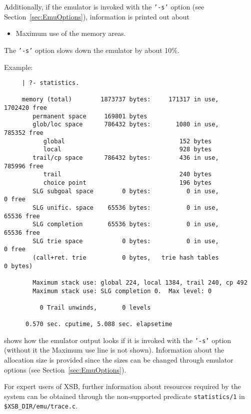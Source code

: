 \begin{description}
    Additionally, if the emulator is invoked with the {\tt '-s'} option
    (see Section~\ref{sec:EmuOptions}), information is printed out about
    \begin{itemize}
    \item Maximum use of the memory areas.
    \end{itemize}
    The {\tt '-s'} option slows down the emulator by about 10\%.

    Example:
    {\footnotesize
     \begin{verbatim}
     | ?- statistics.

     memory (total)        1873737 bytes:     171317 in use,    1702420 free
        permanent space     169801 bytes
        glob/loc space      786432 bytes:       1080 in use,     785352 free
           global                                152 bytes
           local                                 928 bytes
        trail/cp space      786432 bytes:        436 in use,     785996 free
           trail                                 240 bytes
           choice point                          196 bytes
        SLG subgoal space        0 bytes:          0 in use,          0 free
        SLG unific. space    65536 bytes:          0 in use,      65536 free
        SLG completion       65536 bytes:          0 in use,      65536 free
        SLG trie space           0 bytes:          0 in use,          0 free
        (call+ret. trie          0 bytes,   trie hash tables          0 bytes)

        Maximum stack use: global 224, local 1384, trail 240, cp 492
        Maximum stack use: SLG completion 0.  Max level: 0

          0 Trail unwinds,       0 levels

      0.570 sec. cputime, 5.088 sec. elapsetime 
\end{verbatim}} 
     shows how the emulator output looks if it is invoked with the
     {\tt '-s'} option (without it the Maximum use line is not shown).
     Information about the allocation size is provided since the sizes
     can be changed through emulator options (see
     Section~\ref{sec:EmuOptions}).

     For expert users of XSB, further information about resources
     required by the system can be obtained through the non-supported
     predicate {\tt statistics/1} in {\tt \$XSB\_DIR/emu/trace.c}.


\end{description}
